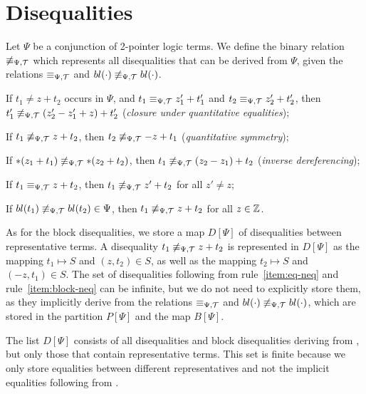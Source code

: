 \section{Disequalities}\label{section:disequalities}

Let $\Psi$ be a conjunction of 2-pointer logic terms.
We define the binary relation $\not\equiv_{\Psi,\mathcal{T}}$ which represents all disequalities that can be derived from $\Psi$, given the relations $\equiv_{\Psi,\mathcal{T}}$ and $bl(\cdot)\not\equiv_{\Psi,\mathcal{T}} bl(\cdot)$.

\begin{enumerate}[label={[D\arabic*]}, ref={[D\arabic*]}]
    \setcounter{enumi}{-1} %
    \item\label{item:neq-quantitative-equalities}
    If $t_1 \neq z + t_2$ occurs in $\Psi$, and $t_1 \equiv_{\Psi,\mathcal{T}} z'_1 + t'_1$ and $t_2\equiv_{\Psi,\mathcal{T}} z'_2+t'_2$,
    then $t'_1\not\equiv_{\Psi,\mathcal{T}} (z'_2-z'_1+z)+t'_2$ (\emph{closure under quantitative equalities});
    \item\label{item:neq-quantitative-symmetry} If $t_1 \not\equiv_{\Psi,\mathcal{T}} z + t_2$, then $t_2 \not\equiv_{\Psi,\mathcal{T}} -z + t_1$ (\emph{quantitative symmetry});
    \item\label{item:inverse-deref}
    If $*(z_1 + t_1) \not\equiv_{\Psi,\mathcal{T}} *(z_2 + t_2)$, then $t_1 \not\equiv_{\Psi,\mathcal{T}} (z_2 - z_1) + t_2$
    (\emph{inverse dereferencing});
    \item\label{item:eq-neq} If $t_1 \equiv_{\Psi,\mathcal{T}} z + t_2$, then $t_1\not\equiv_{\Psi,\mathcal{T}} z'+t_2$ for all $z'\neq z$;
    \item\label{item:block-neq} If $bl(t_1) \not\equiv_{\Psi,\mathcal{T}} bl(t_2) \in \Psi$, then $t_1 \not\equiv_{\Psi,\mathcal{T}} z + t_2$ for all $z \in \mathbb{Z}$.
\end{enumerate}

As for the block disequalities, we store a map $D[\Psi]$ of disequalities between representative terms.
A disequality $t_1 \not\equiv_{\Psi,\mathcal{T}} z + t_2$ is represented in $D[\Psi]$ as the mapping $t_1 \mapsto S$ and $(z, t_2) \in S$, as well as the mapping $t_2 \mapsto S$ and $(-z, t_1) \in S$.
The set of disequalities following from rule~\ref{item:eq-neq} and rule~\ref{item:block-neq} can be infinite, but we do not need to explicitly store them, as they implicitly derive from the relations $\equiv_{\Psi,\mathcal{T}}$ and $bl(\cdot)\not\equiv_{\Psi,\mathcal{T}} bl(\cdot)$, which are stored in the partition $P[\Psi]$ and the map $B[\Psi]$.

The list $D[\Psi]$ consists of all disequalities and block disequalities deriving from
,
but only those that contain representative terms.
This set is finite because we only store equalities between different representatives and not the implicit equalities following from .

